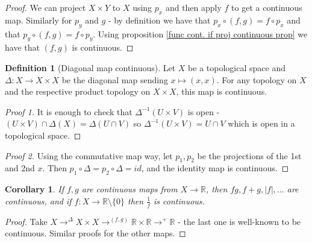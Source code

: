 \documentclass{article}
\theoremstyle{definition}
\newtheorem{defn}{Definition}[section]
\theoremstyle{plain}%
\newtheorem*{cor}{Corollary}
\theoremstyle{remark}
\newcommand{\cross}{\times}
\newcommand{\R}{\mathbb{R}}
\begin{document}
\begin{proof}
    We can project $X \times Y$ to $X$ using $p_x$ and then apply $f$ to get a continuous map. Similarly for $p_y$ and $g$ - by definition we have that $p_x \circ (f,g) = f \circ p_x$ and that $p_y \circ (f,g) = f \circ p_y$. Using proposition \ref{func cont. if proj continuous prop} we have that $(f,g)$ is continuous.
    
\end{proof}

\begin{defn}[Diagonal map continuous]
    Let $X$ be a topological space and $\Delta : X \to X \times X$ be the diagonal map sending $x \mapsto (x,x)$. For any topology on $X$ and the respective product topology on $X \times X$, this map is continuous.
\end{defn}

\begin{proof}[Proof 1]
It is enough to check that $\Delta^{-1} (U \times V)$ is open - $(U \times V) \cap \Delta(X) = \Delta(U \cap V)$ so $\Delta^{-1}(U \times V) = U \cap V$ which is open in a topological space.
\end{proof}

\begin{proof}[Proof 2]
    Using the commutative map way, let $p_1, p_2$ be the projections of the 1st and 2nd $x$. Then $p_1 \circ \Delta = p_2 \circ \Delta = id$, and the identity map is continuous.
\end{proof}

\begin{cor}
    If $f,g$ are continuous maps from $X \to \R$, then $fg, f+g, |f|,...$ are continuous, and if $f : X \to \R \setminus \{0\}$ then $\frac{1}{f}$ is continuous.
\end{cor}

\begin{proof}
    Take $X \to^\Delta X \times X \to^{(f,g)} \R \times \R \to^+ \R$ - the last one is well-known to be continuous. Similar proofs for the other maps.
    
\end{proof}
\end{document}
